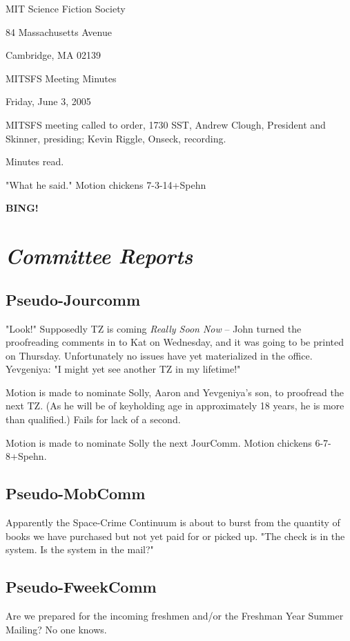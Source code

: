 \documentclass[10pt]{article}
\newcommand{\bing}{{\bf BING!} }
\newcommand{\goto}[1]{\bing \vskip 12pt \section*{{\em{#1}}}}
\begin{document}
\begin{center}

MIT Science Fiction Society

84 Massachusetts Avenue

Cambridge, MA 02139

\vspace{12pt}

MITSFS Meeting Minutes

Friday, June 3, 2005

\end{center}

\vspace{18pt}

\setlength{\parskip}{6pt}

\noindent
MITSFS meeting called to order, 1730 SST, Andrew Clough, President and
Skinner, presiding; Kevin Riggle,  Onseck, recording.

Minutes read.

"What he said." Motion chickens 7-3-14+Spehn

\goto{Committee Reports}
\subsection*{Pseudo-Jourcomm}
"Look!"  Supposedly TZ is coming {\em Really Soon Now} -- John turned the
proofreading comments in to Kat on Wednesday, and it was going to be
printed on Thursday.  Unfortunately no issues have yet materialized in
the office.
Yevgeniya: "I might yet see another TZ in my lifetime!"

Motion is made to nominate Solly, Aaron and Yevgeniya's son, to proofread 
the next TZ.  (As he will be of keyholding age in approximately 18 years,
he is more than qualified.)  Fails for lack of a second.

Motion is made to nominate Solly the next JourComm.  Motion 
chickens 6-7-8+Spehn.

\subsection*{Pseudo-MobComm}
Apparently the Space-Crime Continuum is about to burst from the 
quantity of books we have purchased but not yet paid for or picked up.
"The check is in the system.  Is the system in the mail?"

\subsection*{Pseudo-FweekComm}
Are we prepared for the incoming freshmen and/or the Freshman Year Summer
Mailing?  No one knows.
\end{document}

